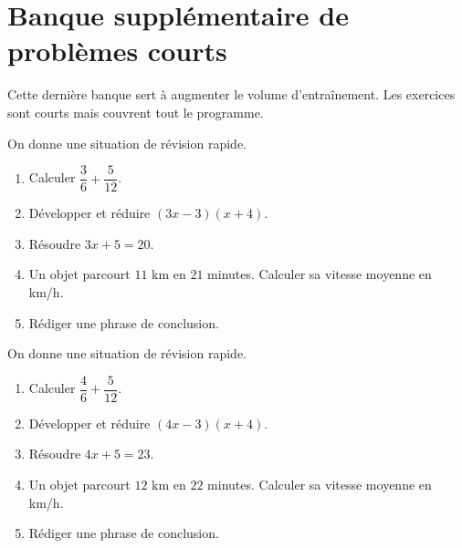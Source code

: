 \documentclass[11pt,a4paper]{article}
\newcounter{exercice}
\begin{document}
\section{Banque supplémentaire de problèmes courts}
\begin{objectif}Cette dernière banque sert à augmenter le volume d’entraînement. Les exercices sont courts mais couvrent tout le programme.\end{objectif}
\begin{exercice}
On donne une situation de révision rapide.
\begin{enumerate}
  \item Calculer $\dfrac{3}{6}+\dfrac{5}{12}$.
  \item Développer et réduire $(3x-3)(x+4)$.
  \item Résoudre $3x+5=20$.
  \item Un objet parcourt $11$ km en $21$ minutes. Calculer sa vitesse moyenne en km/h.
  \item Rédiger une phrase de conclusion.
\end{enumerate}
\end{exercice}
\begin{exercice}
On donne une situation de révision rapide.
\begin{enumerate}
  \item Calculer $\dfrac{4}{6}+\dfrac{5}{12}$.
  \item Développer et réduire $(4x-3)(x+4)$.
  \item Résoudre $4x+5=23$.
  \item Un objet parcourt $12$ km en $22$ minutes. Calculer sa vitesse moyenne en km/h.
  \item Rédiger une phrase de conclusion.
\end{enumerate}
\end{exercice}
\end{document}

